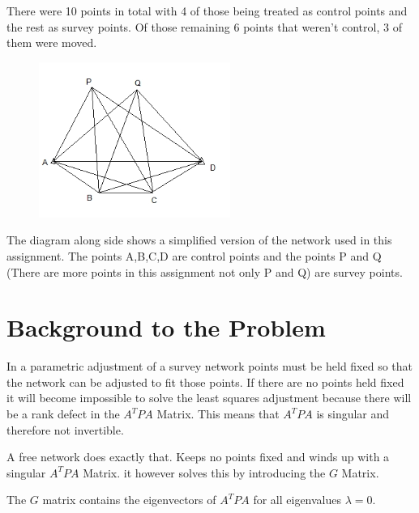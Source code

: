 \documentclass[11pt,a4paper]{article}
\begin{document}
	There were 10 points in total with 4 of those being treated as control points and the rest as survey points. Of those remaining 6 points that weren't control, 3 of them were moved.
	\begin{minipage}{0.5\linewidth}

	\begin{figure}[H]
		\centering
		\includegraphics[width=0.6\linewidth]{images/unnamed}
		\label{fig:figure}
	\end{figure}

	\end{minipage}
	\begin{minipage}{0.5\linewidth}
		
	The diagram along side shows a simplified version of the network used in this assignment. The points A,B,C,D are control points and the points P and Q (There are more points in this assignment not only P and Q) are survey points.
		
	\end{minipage}
	
	\section{Background to the Problem}
	
	In a parametric adjustment of a survey network points must be held fixed so that the network can be adjusted to fit those points. If there are no points held fixed it will become impossible to solve the least squares adjustment because there will be a rank defect in the $A^TPA$ Matrix. This means that $A^TPA$ is singular and therefore not invertible.
	
	A free network does exactly that. Keeps no points fixed and winds up with a singular $A^TPA$ Matrix. it however solves this by introducing the $G$ Matrix.
	
	The $G$ matrix contains the eigenvectors of $A^TPA$ for all eigenvalues $\lambda = 0$.
	
\end{document}
